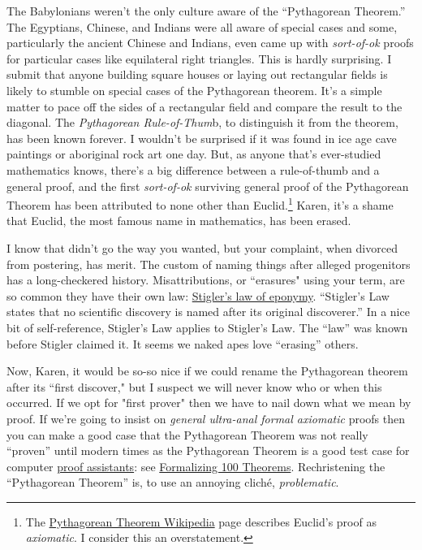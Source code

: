 
The Babylonians weren't the only culture aware of the ``Pythagorean
Theorem.'' The Egyptians, Chinese, and Indians were all aware of special
cases and some, particularly the ancient Chinese and Indians, even came
up with \emph{sort-of-ok} proofs for particular cases like equilateral
right triangles. This is hardly surprising. I submit that anyone
building square houses or laying out rectangular fields is likely to
stumble on special cases of the Pythagorean theorem. It's a simple
matter to pace off the sides of a rectangular field and compare the
result to the diagonal. The \emph{Pythagorean Rule-of-Thum}b, to
distinguish it from the theorem, has been known forever. I wouldn't be
surprised if it was found in ice age cave paintings or aboriginal rock
art one day. But, as anyone that's ever-studied mathematics knows,
there's a big difference between a rule-of-thumb and a general proof,
and the first \emph{sort-of-ok} surviving general proof of the
Pythagorean Theorem has been attributed to none other than
Euclid.\footnote{The
  \href{https://en.wikipedia.org/wiki/Pythagorean_theorem}{Pythagorean Theorem
  Wikipedia} page describes Euclid's proof as \emph{axiomatic}. I
  consider this an overstatement.
} Karen, it's a shame that Euclid, the most famous name in mathematics,
has been erased.

I know that didn't go the way you wanted, but your complaint, when
divorced from postering, has merit. The custom of naming things after
alleged progenitors has a long-checkered history. Misattributions, or
``erasures" using your term, are so common they have their own law:
\href{https://en.wikipedia.org/wiki/Stigler\%27s_law_of_eponymy}{Stigler's
law of eponymy}. ``Stigler's Law states that no scientific
discovery is named after its original discoverer.'' In a nice bit of
self-reference, Stigler's Law applies to Stigler's Law. The ``law'' was
known before Stigler claimed it. It seems we naked apes love ``erasing''
others.

Now, Karen, it would be so-so nice if we could rename the Pythagorean
theorem after its ``first discover," but I suspect we will never know
who or when this occurred. If we opt for "first prover" then we have to
nail down what we mean by proof. If we're going to insist on
\emph{general ultra-anal formal axiomatic} proofs then you can
make a good case that the Pythagorean Theorem was not really ``proven''
until modern times as the Pythagorean Theorem is a good test case for
computer \href{https://en.wikipedia.org/wiki/Proof_assistant}{proof
assistants}: see \href{https://www.cs.ru.nl/~freek/100/}{Formalizing 100
Theorems}. Rechristening the ``Pythagorean Theorem'' is, to use an
annoying cliché, \emph{problematic}.

